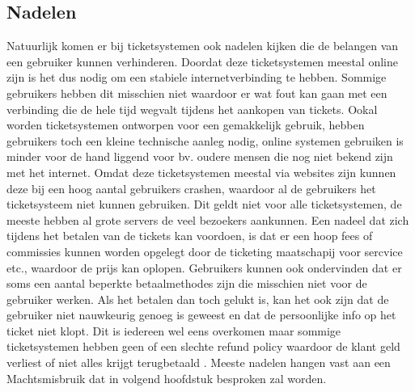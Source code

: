 \subsection{Nadelen}
Natuurlijk komen er bij ticketsystemen ook nadelen kijken die de belangen van een gebruiker kunnen verhinderen. Doordat deze ticketsystemen meestal online zijn is het dus nodig om een stabiele internetverbinding te hebben.
Sommige gebruikers hebben dit misschien niet waardoor er wat fout kan gaan met een verbinding die de hele tijd wegvalt tijdens het aankopen van tickets. Ookal worden ticketsystemen ontworpen voor een gemakkelijk gebruik,
hebben gebruikers toch een kleine technische aanleg nodig, online systemen gebruiken is minder voor de hand liggend voor bv. oudere mensen die nog niet bekend zijn met het internet.
Omdat deze ticketsystemen meestal via websites zijn kunnen deze bij een hoog aantal gebruikers crashen, waardoor al de gebruikers het ticketsysteem niet kunnen gebruiken. Dit geldt niet voor alle ticketsystemen, de meeste hebben al grote servers de veel bezoekers aankunnen.
Een nadeel dat zich tijdens het betalen van de tickets kan voordoen, is dat er een hoop fees of commissies kunnen worden opgelegt door de ticketing maatschapij voor sercvice etc., waardoor de prijs kan oplopen. 
Gebruikers kunnen ook ondervinden dat er soms een aantal beperkte betaalmethodes zijn die misschien niet voor de gebruiker werken. Als het betalen dan toch gelukt is, kan het ook zijn dat de gebruiker niet nauwkeurig genoeg is geweest en dat de persoonlijke info op het ticket niet klopt.
Dit is iedereen wel eens overkomen maar sommige ticketsystemen hebben geen of een slechte refund policy waardoor de klant geld verliest of niet alles krijgt terugbetaald \cite{concert-tickets-online2021}. Meeste nadelen hangen vast aan een Machtsmisbruik dat in volgend hoofdstuk besproken zal worden.


